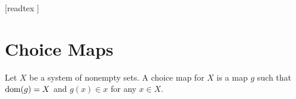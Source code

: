 \documentclass[10pt]{article}
\begin{document}
  \begin{imports}
    \begin{forthel}
      [readtex ]
    \end{forthel}
  \end{imports}


  \section*{Choice Maps}

  \begin{forthel}
    \begin{definition}[id=FOUNDATIONS_10_1352015487625913,printid]
      Let $X$ be a system of nonempty sets.
      A choice map for $X$ is a map $g$ such that $\operatorname{dom}(g) = X$ and $g(x) \in x$ for any $x \in X$.
    \end{definition}
  \end{forthel}
\end{document}
